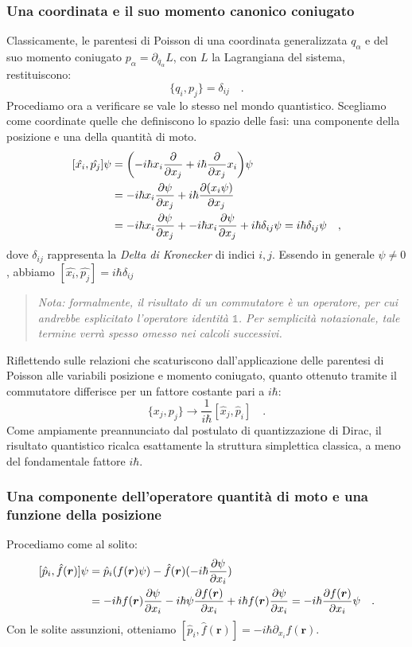 \subsubsection{Una coordinata e il suo momento canonico coniugato}
Classicamente, le parentesi di Poisson di una coordinata generalizzata $q_\alpha$ e del suo momento coniugato $p_\alpha = \partial_{\dot{q_\alpha}} L$, con $L$ la Lagrangiana del sistema, restituiscono:
\[
\{q_i, p_j\} = \delta_{ij} \quad.
\]
Procediamo ora a verificare se vale lo stesso nel mondo quantistico. Scegliamo come coordinate quelle che definiscono lo spazio delle fasi: una componente della posizione e una della quantità di moto.
\begin{equation*}
    \begin{aligned}
    [\hat{x_i}, \hat{p_j}]\psi &= \biggl(-i\hbar x_i\pdv{}{x_j} + i\hbar \pdv{}{x_j}x_i \biggr)\psi   \\
    &= -i\hbar x_i\pdv{\psi}{x_j} + i\hbar \pdv{(x_i\psi)}{x_j} \\
    &= -i\hbar x_i\pdv{\psi}{x_j} + -i\hbar x_i\pdv{\psi}{x_j} + i\hbar \delta_{ij}\psi = i\hbar \delta_{ij}\psi \quad,
    \end{aligned}
\end{equation*}
dove $\delta_{ij}$ rappresenta la \emph{Delta di Kronecker} di indici $i,j$. Essendo in generale $\psi \neq 0$, abbiamo $[\hat{x_i}, \hat{p_j}] = i\hbar \delta_{ij}$

\begin{quote}
\emph{Nota: formalmente, il risultato di un commutatore è un operatore, per cui andrebbe esplicitato l'operatore identità $\mathds{1}$. Per semplicità notazionale, tale termine verrà spesso omesso nei calcoli successivi.}
\end{quote}

Riflettendo sulle relazioni che scaturiscono dall'applicazione delle parentesi di Poisson alle variabili posizione e momento coniugato, quanto ottenuto tramite il commutatore differisce per un fattore costante pari a $i\hbar$:
\[
    \{x_j, p_j\} \rightarrow \frac{1}{i\hbar}[\hat{x}_j, \hat{p}_i] \quad.
\]
Come ampiamente preannunciato dal postulato di quantizzazione di Dirac, il risultato quantistico ricalca esattamente la struttura simplettica classica, a meno del fondamentale fattore $i\hbar$.

\subsubsection{Una componente dell'operatore quantità di moto e una funzione della posizione}
Procediamo come al solito:
\[
\begin{aligned}
    [\hat{{p}}_i, \hat{f}(\bm{r})]\psi &= \hat{p}_i (f(\bm{r})\psi) - \hat{f}(\bm{r})(-i\hbar\pdv{\psi}{x_i}) \\
    &= -i\hbar f(\bm{r})\pdv{\psi}{x_i} - i\hbar\psi\pdv{f(\bm{r})}{x_i} + i\hbar {f}(\bm{r})\pdv{\psi}{x_i} = - i\hbar\pdv{f(\bm{r})}{x_i} \psi \quad.
\end{aligned}
\]
Con le solite assunzioni, otteniamo $[\hat{{p}}_i, \hat{f}(\bm{r})] = -i\hbar \partial_{x_i} f(\bm{r})$.

